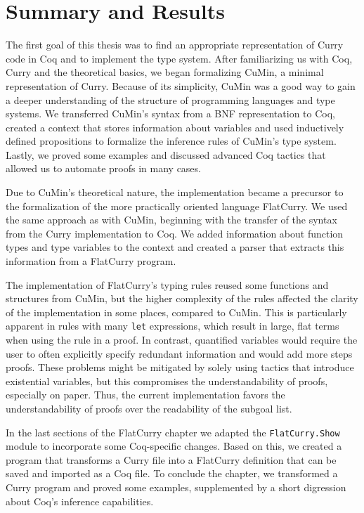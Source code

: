 \documentclass[paper = a4, fleqn, abstract=on, twoside]{scrreprt}
\begin{document}
\section{Summary and Results}
The first goal of this thesis was to find an appropriate representation of Curry code in Coq and to implement the type system. After familiarizing us with Coq, Curry and the theoretical basics, we began formalizing CuMin, a minimal representation of Curry. Because of its simplicity, CuMin was a good way to gain a deeper understanding of the structure of programming languages and type systems. We transferred CuMin's syntax from a BNF representation to Coq, created a context that stores information about variables and used inductively defined propositions to formalize the inference rules of CuMin's type system. Lastly, we proved some examples and discussed advanced Coq tactics that allowed us to automate proofs in many cases.\\
\par \noindent
Due to CuMin's theoretical nature, the implementation became a precursor to the formalization of the more practically oriented language FlatCurry. We used the same approach as with CuMin, beginning with the transfer of the syntax from the Curry implementation to Coq. We added information about function types and type variables to the context and created a parser that extracts this information from a FlatCurry program.
\par
The implementation of FlatCurry's typing rules reused some functions and structures from CuMin, but the higher complexity of the rules affected the clarity of the implementation in some places, compared to CuMin. This is particularly apparent in rules with many \texttt{let} expressions, which result in large, flat terms when using the rule in a proof. In contrast, quantified variables would require the user to often explicitly specify redundant information and would add more steps proofs. These problems might be mitigated by solely using tactics that introduce existential variables, but this compromises the understandability of proofs, especially on paper. Thus, the current implementation favors the understandability of proofs over the readability of the subgoal list.
\par
In the last sections of the FlatCurry chapter we adapted the \texttt{FlatCurry.Show} module to incorporate some Coq-specific changes. Based on this, we created a program that transforms a Curry file into a FlatCurry definition that can be saved and imported as a Coq file. To conclude the chapter, we transformed a Curry program and proved some examples, supplemented by a short digression about Coq's inference capabilities.\\
\end{document}
